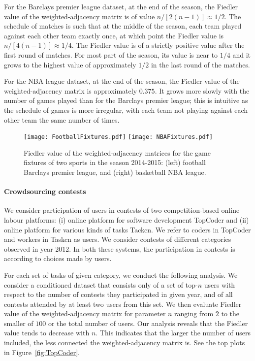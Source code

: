 For the Barclays premier league dataset, at the end of the season, the Fiedler value of the weighted-adjacency matrix is of value $n/[2(n-1)] \approx 1/2$. The schedule of matches is such that at the middle of the season, each team played against each other team exactly once, at which point the Fiedler value is $n/[4(n-1)] \approx 1/4$. The Fiedler value is of a strictly positive value after the first round of matches. For most part of the season, its value is near to $1/4$ and it grows to the highest value of approximately $1/2$ in the last round of the matches.

For the NBA league dataset, at the end of the season, the Fiedler value of the weighted-adjacency matrix is approximately $0.375$. It grows more slowly with the number of games played than for the Barclays premier league; this is intuitive as the schedule of games is more irregular, with each team not playing against each other team the same number of times.

\begin{figure}[t]
\centering
\vspace*{-1.85cm}
\texttt{[image: FootballFixtures.pdf]}\hspace*{-0.2cm}
\texttt{[image: NBAFixtures.pdf]}
\vspace*{-2cm}
\caption{Fiedler value of the weighted-adjacency matrices for the game fixtures of two sports in the season 2014-2015: (left) football Barclays premier league, and (right) basketball NBA league.}
\label{fig:premier-nba}
\end{figure}

\paragraph{Crowdsourcing contests} We consider participation of users in contests of two competition-based online labour platforms: (i) online platform for software development TopCoder and (ii) online platform for various kinds of tasks Tackcn. We refer to coders in TopCoder and workers in Taskcn as users. We consider contests of different categories observed in year 2012. In both these systems, the participation in contests is according to choices made by users. 

For each set of tasks of given category, we conduct the following analysis. We consider a conditioned dataset that consists only of a set of top-$n$ users with respect to the number of contests they participated in given year, and of all contests attended by at least two users from this set. We then evaluate Fiedler value of the weighted-adjacency matrix for parameter $n$ ranging from $2$ to the smaller of $100$ or the total number of users. Our analysis reveals that the Fiedler value tends to decrease with $n$. This indicates that the larger the number of users included, the less connected the weighted-adjacency matrix is. See the top plots in Figure~\ref{fig:TopCoder}. 

